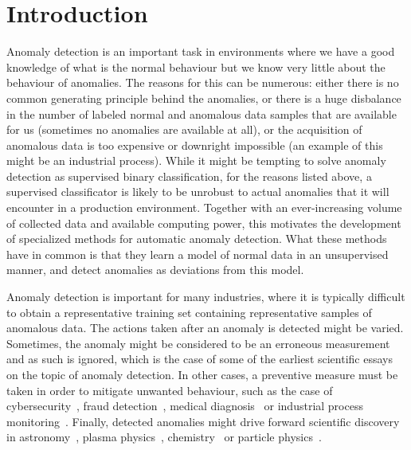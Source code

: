 \chapter{Introduction}

Anomaly detection is an important task in environments where we have a good knowledge of what is the normal behaviour but we know very little about the behaviour of anomalies. The reasons for this can be numerous: either there is no common generating principle behind the anomalies, or there is a huge disbalance in the number of labeled normal and anomalous data samples that are available for us (sometimes no anomalies are available at all), or the acquisition of anomalous data is too expensive or downright impossible (an example of this might be an industrial process). While it might be tempting to solve anomaly detection as supervised binary classification, for the reasons listed above, a supervised classificator is likely to be unrobust to actual anomalies that it will encounter in a production environment. Together with an ever-increasing volume of collected data and available computing power, this motivates the development of specialized methods for automatic anomaly detection. What these methods have in common is that they learn a model of normal data in an unsupervised manner, and detect anomalies as deviations from this model. 

Anomaly detection is important for many industries, where it is typically difficult to obtain a representative training set containing representative samples of anomalous data. The actions taken after an anomaly is detected might be varied. Sometimes, the anomaly might be considered to be an erroneous measurement and as such is ignored, which is the case of some of the earliest scientific essays~\cite{glaisher1873rejection,edgeworth1887xli} on the topic of anomaly detection. In other cases, a preventive measure must be taken in order to mitigate unwanted behaviour, such as the case of cybersecurity~\cite{liao2013intrusion, vanerio2017ensemble,xin2018machine}, fraud detection~\cite{bolton2002statistical, perols2011financial, ahmed2016survey}, medical diagnosis~\cite{tarassenko1995novelty, wong2003bayesian, iakovidis2018detecting,zhou2019anomalynet} or industrial process monitoring~\cite{mahmoudi2019layerwise, bai2020anomaly, choi2020gan}. Finally, detected anomalies might drive forward scientific discovery in astronomy~\cite{protopapas2006finding}, plasma physics~\cite{vskvara2020detection}, chemistry~\cite{oprea2002chemical} or particle physics~\cite{fraser2022challenges}.

